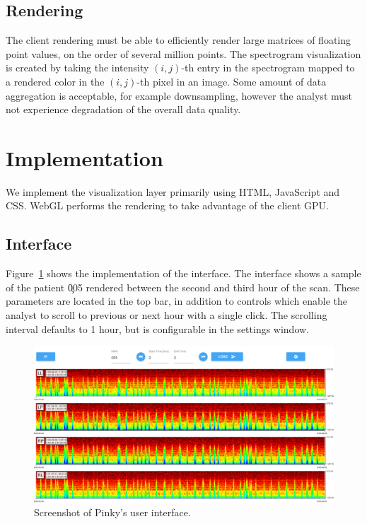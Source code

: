 \subsection{Rendering}

The client rendering must be able to efficiently render large matrices of
floating point values, on the order of several million points.  The spectrogram
visualization is created by taking the intensity $(i, j)$-th entry in the
spectrogram mapped to a rendered color in the $(i, j)$-th pixel in an image.
Some amount of data aggregation is acceptable, for example downsampling,
however the  analyst must not experience degradation of the overall data
quality. \\

\section{Implementation}

We implement the visualization layer primarily using HTML, JavaScript and CSS.
WebGL performs the rendering to take advantage of the client GPU.

\subsection{Interface}

Figure~\ref{fig:whole-interface} shows the implementation of the interface. The
interface shows a sample of the patient \c{005} rendered between the second and
third hour of the scan. These parameters are located in the top bar, in
addition to controls which enable the analyst to scroll to previous or next
hour with a single click. The scrolling interval defaults to 1 hour, but is
configurable in the settings window. \\

\begin{figure}[h]
\begin{center}
\includegraphics[scale=0.35]{./img/whole-interface.png}
\caption{Screenshot of Pinky's user interface.}
\label{fig:whole-interface}
\end{center}
\end{figure}

